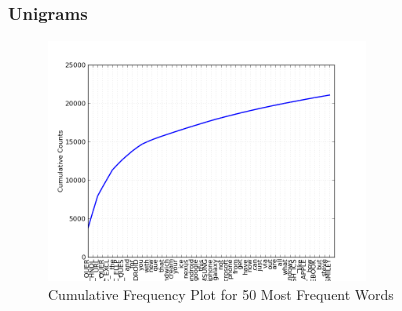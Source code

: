 \documentclass{beamer}
\begin{document}

\begin{frame}
\frametitle{Unigrams}

\begin{figure}[h]
\centering
\includegraphics[width=0.75\textwidth]{img/fdist-unigrams.png}
\caption{Cumulative Frequency Plot for 50 Most Frequent Words}
\label{fig:unigrams}
\end{figure}

\end{frame}

\end{document}

